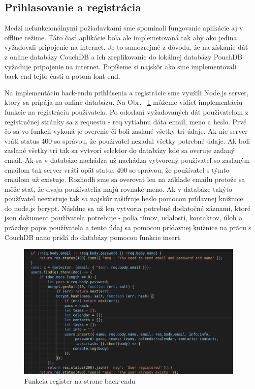\subsection{Prihlasovanie a registrácia}
\indent Medzi nefunkcionálnymi požiadavkami sme spomínali fungovanie aplikácie aj v offline režime. Táto časť aplikácie bola ale implemetovaná tak aby ako jedina vyžadovali pripojenie na internet. Je to samozrejmé z dôvodu, že na získanie dát z online databázy CouchDB a ich zreplikovanie do lokálnej databázy PouchDB vyžaduje pripojenie na internet. Popíšeme si najskôr ako sme implementovali back-end tejto časti a potom font-end.

\indent Na implementáciu back-endu prihlásenia a registrácie sme využili Node.js server, ktorý sa prípája na online databázu. Na Obr. ~\ref{fig:register_back} môžeme vidieť implementáciu funkcie na registráciu používateľa. Po odoslaní vyžadovaných dát používatelom z registračnej stránky sa z requestu - req vytiahnu dáta email, meno a heslo. Prvé čo sa vo funkcii vykoná je overenie či boli zaslané všetky tri údaje. Ak nie server vráti status 400 so správou, že používatel nezadal všetky potrebné údaje. Ak boli zaslané všetky tri tak sa vytvorí selektor do databázy kde sa overuje zadaný email. Ak sa v databáze nachádza už nachádza vytvorený používateľ so zaslaným emailom tak server vráti opäť status 400 so správou, že používatel s týmto emailom už existuje. Rozhodli sme sa overovať len na základe emailu pretože sa môže stať, že dvaja používatelia majú rovnaké meno. Ak v databáze takýto používatel neexistuje tak sa najskôr zašifruje heslo pomocou prídavnej knižnice do node.js bcrypt. Násldne sa už len vytvoria potrebné dodatočné záznami, ktoré json dokument používatela potrebuje - polia tímov, udalostí, kontaktov, úloh a prázdny popis používatela a tento údaj sa pomocou prídavnej knižnice na prácu s CouchDB nano pridá do databázy pomocou funkcie insert.
\begin{figure}[H]
    \centering
    \includegraphics[scale=0.45]{img/imp/register_back.png}
    \caption{Funkcia register na strane back-endu}
    \label{fig:register_back}
\end{figure}

